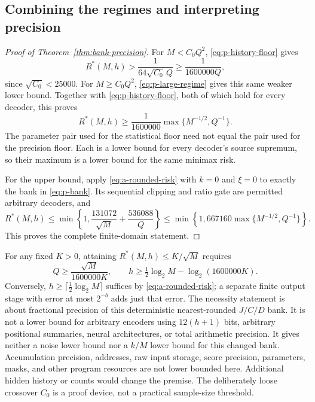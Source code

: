 \subsection{Combining the regimes and interpreting precision}

\begin{proof}[Proof of Theorem~\ref{thm:bank-precision}]
For $M<C_0Q^2$, \eqref{eq:p-history-floor} gives
\[
 R^*(M,h)>\frac1{64\sqrt{C_0}\,Q}
 \ge\frac1{1600000Q},
\]
since $\sqrt{C_0}<25000$.
For $M\ge C_0Q^2$, \eqref{eq:p-large-regime} gives this same weaker
lower bound.  Together with \eqref{eq:p-history-floor}, both of
which hold for every decoder, this proves
\[
 R^*(M,h)\ge\frac1{1600000}
              \max\{M^{-1/2},Q^{-1}\}.
\]
The parameter pair used for the statistical floor need not equal the
pair used for the precision floor.  Each is a lower bound for every
decoder's source supremum, so their maximum is a lower bound for the
same minimax risk.

For the upper bound, apply \eqref{eq:a-rounded-risk} with $k=0$ and
$\xi=0$ to exactly the bank in \eqref{eq:p-bank}.  Its sequential
clipping and ratio gate are permitted arbitrary decoders, and
\[
 R^*(M,h)\le\min\left\{1,
 \frac{131072}{\sqrt M}+\frac{536088}{Q}\right\}
 \le\min\left\{1,667160\max\{M^{-1/2},Q^{-1}\}\right\}.
\]
This proves the complete finite-domain statement.
\end{proof}

For any fixed $K>0$, attaining $R^*(M,h)\le K/\sqrt M$ requires
\[
 Q\ge\frac{\sqrt M}{1600000K},\qquad
 h\ge\tfrac12\log_2 M-\log_2(1600000K).
\]
Conversely, $h\ge\lceil\tfrac12\log_2 M\rceil$ suffices by
\eqref{eq:a-rounded-risk}; a separate finite output stage with error
at most $2^{-b}$ adds just that error.  The necessity statement is
about fractional precision of this deterministic nearest-rounded
$J/C/D$ bank.  It is not a lower bound for arbitrary encoders using
$12(h+1)$ bits, arbitrary positional summaries, neural architectures,
or total arithmetic precision.  It gives neither a noise lower bound
nor a $k/M$ lower bound for this changed bank.  Accumulation precision,
addresses, raw input storage, score precision, parameters, masks, and
other program resources are not lower bounded here.  Additional hidden
history or counts would change the premise.  The deliberately loose
crossover $C_0$ is a proof device, not a practical sample-size threshold.
